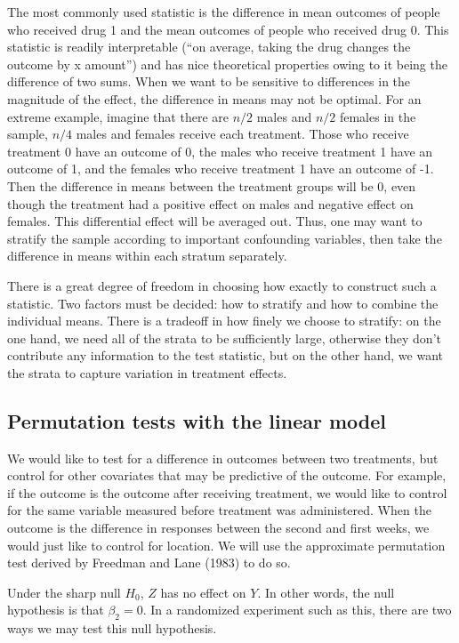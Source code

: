 \documentclass[11pt]{article}
\newcommand{\todo}[1]{{\color{red}{TO DO: \sc #1}}}
\begin{document}
The most commonly used statistic is the difference in mean outcomes of people who received drug 1 and the mean outcomes of people who received drug 0.  This statistic is readily interpretable (``on average, taking the drug changes the outcome by x amount'') and has nice theoretical properties owing to it being the difference of two sums.
When we want to be sensitive to differences in the magnitude of the effect, the difference in means may not be optimal.  For an extreme example, imagine that there are $n/2$ males and $n/2$ females in the sample, $n/4$ males and females receive each treatment.  Those who receive treatment 0 have an outcome of 0, the males who receive treatment 1 have an outcome of 1, and the females who receive treatment 1 have an outcome of -1.  Then the difference in means between the treatment groups will be $0$, even though the treatment had a positive effect on males and negative effect on females.  This differential effect will be averaged out.
Thus, one may want to stratify the sample according to important confounding variables, then take the difference in means within each stratum separately. 

There is a great degree of freedom in choosing how exactly to construct such a statistic.
Two factors must be decided: how to stratify and how to combine the individual means.
There is a tradeoff in how finely we choose to stratify:
on the one hand, we need all of the strata to be sufficiently large, otherwise they don't contribute any information to the test statistic,
 but on the other hand, we want the strata to capture variation in treatment effects.
\todo{discussion of NPC and cite papers}


\subsection{Permutation tests with the linear model}
We would like to test for a difference in outcomes between two treatments, but control for other covariates that may be predictive of the outcome.
For example, if the outcome is the outcome after receiving treatment, we would like to control for the same variable measured before treatment was administered.
When the outcome is the difference in responses between the second and first weeks, we would just like to control for location.
We will use the approximate permutation test derived by Freedman and Lane (1983) to do so.

Under the sharp null $H_0$, $Z$ has no effect on $Y$.
In other words, the null hypothesis is that $\beta_2 = 0$.
In a randomized experiment such as this, there are two ways we may test this null hypothesis.
\end{document}
